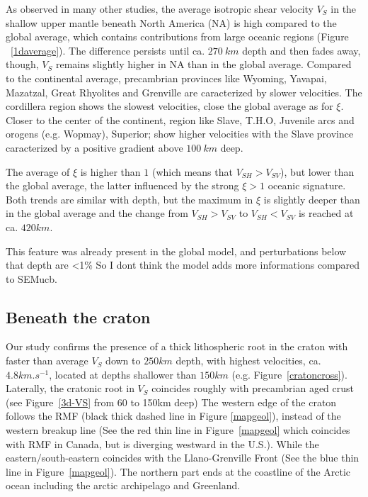 \documentclass[12pt]{article}
\begin{document}
		As observed in many other studies, the average isotropic shear velocity $V_S$ in the shallow upper mantle beneath North America (NA) is high compared to the global average, which contains contributions from large oceanic regions (Figure ~\ref{1daverage}). 
		The difference persists until ca. $270 \: km$ depth and then fades away, though, $V_S$ remains slightly higher in NA than in the global average. 
		Compared to the continental average, precambrian provinces like Wyoming, Yavapai, Mazatzal, Great Rhyolites and Grenville are caracterized by slower velocities. 
		The cordillera region shows the slowest velocities, close the global average as for $\xi$. 
		Closer to the center of the continent, region like Slave, T.H.O, Juvenile arcs and orogens (e.g. Wopmay), Superior; show higher velocities with the Slave province caracterized by a positive gradient above $100 \: km$ deep.


		The average of $\xi$ is higher than $1$ (which means that $V_{SH} > V_{SV}$), but lower than the global average, the latter influenced by the strong $\xi > 1$ oceanic signature.
		Both trends are similar with depth, but the maximum in $\xi$ is slightly deeper than in the global average and the change from $V_{SH} > V_{SV}$ to $V_{SH} < V_{SV}$ is reached at ca. $420km$. 

		{\color{red} This feature was already present in the global model, and perturbations below that depth are <1\% So I dont think the model adds more informations compared to SEMucb}.

	\subsection{Beneath the craton}


		Our study confirms the presence of a thick lithospheric root in the craton with faster than average $V_S$ down to $250km$ depth, with highest velocities, ca. $4.8km.s^{-1}$, located at depths shallower than  $150km$ (e.g. Figure~\ref{cratoncross}). 
		Laterally, the cratonic root in $V_S$ coincides roughly with precambrian aged crust (see Figure~\ref{3d-VS} from 60 to 150km deep)
		The western edge of the craton follows the RMF (black thick dashed line in Figure \ref{mapgeol}), instead of the western breakup line (See the red thin line in Figure~\ref{mapgeol} which coincides with RMF in Canada, but is diverging westward in the U.S.). While the eastern/south-eastern coincides with the Llano-Grenville Front (See the blue thin line in Figure~\ref{mapgeol}). 
		The northern part ends at the coastline of the Arctic ocean including the arctic archipelago and Greenland. 
\end{document}
